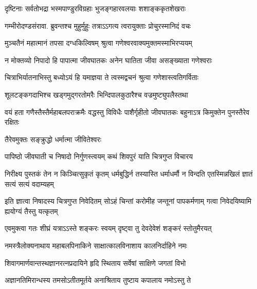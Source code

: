 \twolineshloka
{दृष्टिनाः सर्वतोभद्रा भस्मपाण्डुरविग्रहाः}
{भुजङ्गहारवलयाः शशाङ्ककृतशेखराः} %

\twolineshloka
{गम्भीरोदण्डसंरावा. ब्रुवन्तश्च मुहुर्मुहुः}
{तत्राऽऽगत्य त्वरायुक्ताः प्रोचुरस्मानिदं वचः} %

\twolineshloka
{मुञ्चतैनं महात्मानं तपसा दग्धकिल्विषम्}
{श्रुत्वा गणेश्वरवाक्यमुक्तमस्माभिरप्ययम्} %

\twolineshloka
{न मोक्तव्यो निपादो हि पापात्मा जीवघातकः}
{अनेन घातिता जीवा असङ्ख्याता गणेश्वराः} %

\twolineshloka
{चित्राभिर्यातनाभिस्तु बध्योऽयं हि यमाज्ञया}
{ते त्वस्मद्वचनं श्रुत्वा गणेशास्त्वतिगर्विताः} %

\twolineshloka
{शूलटङ्कगदाभिश्च खड्गमुद्गरतोमरैः}
{भिन्दिपालकुठारैश्च वज्रमुष्ट्युपलैस्तथा} %

\threelineshloka
{वयं हता गणैस्तैस्तैर्महाबलपराक्रमैः}
{वद्धस्तु विविधैः पाशैर्गृहीतो जीवघातकः}
{बहुनाऽत्र किमुक्तेन पुनस्तैरेव रक्षितः} %


\onelineshloka
{तैरेवमुक्तः सङ्क्रुद्धो धर्मात्मा जीवितेश्वरः} %


\twolineshloka
{पापिष्ठो जीवघाती च निषादो निर्गुणस्त्वयम्}
{कथं शिवपुरं याति चित्रगुप्त विचारय} %


\threelineshloka
{निरीक्ष्य पुस्तकं तेन न किञ्चित्सुकृतं कृतम्}
{धर्मबुद्धिर्न तस्यास्ति धर्माधर्मौ\footnotemark{} न विन्दति}
{एतस्मिन्नखिलं ज्ञातं सत्यं सत्यं वदाम्यहम्} %



\threelineshloka
{इति ज्ञात्वा निषादस्य चित्रगुप्त निवेदितम्}
{सोऽहं चिन्तां करोमीह जन्तूनां पापकर्मणाम्}
{गत्वा निवेदयिष्यामि ह्ययोग्यं तैस्तु यत्कृतम्} %


\twolineshloka
{एवमुक्त्वा गतः शीघ्रं यत्राऽऽस्ते शङ्करः स्वयम्}
{दृष्ट्वा तु देवदेवेशं शङ्करं स्तोतुमैरयत्} %


\twolineshloka
{नमस्त्रैलोक्यनाथाय महाबलपिनाकिने}
{साक्षात्कालविनाशाय कालनिर्दाहिने नमः} %

\twolineshloka
{शिवागमार्णवान्तस्थज्ञानरत्नप्रदायिने}
{हृदि स्थिताय सर्वेषां साक्षिणे जगतां विभो} %

\twolineshloka
{अज्ञानतिमिरान्धस्य तमसोऽतीतमूर्तये}
{अनाश्रिताय तुष्टाय कपालाय नमोऽस्तु ते} %

